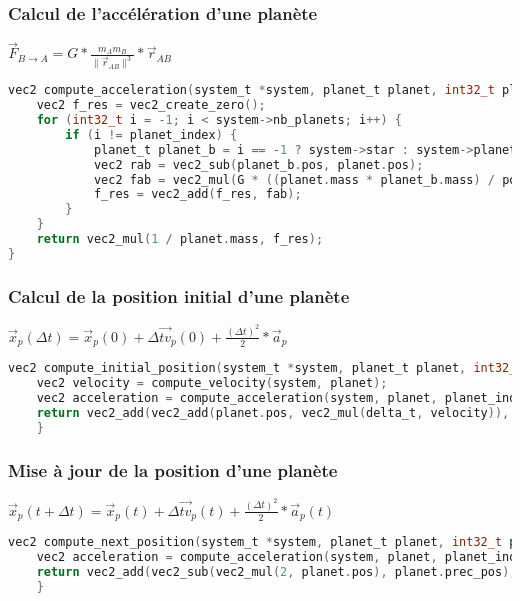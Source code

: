\documentclass[a4paper,10pt]{article}
\begin{document}
    \subsubsection{Calcul de l'accélération d'une planète}

    $\vec{F}_{B\to{}A} = G * \frac{m_{A}m_{B}}{\|\vec{r}_{AB}\|^{3}} * \vec{r}_{AB}$

    \begin{lstlisting}[language=c,label={lst:lstlisting4}]
        vec2 compute_acceleration(system_t *system, planet_t planet, int32_t planet_index) {
    vec2 f_res = vec2_create_zero();
    for (int32_t i = -1; i < system->nb_planets; i++) {
        if (i != planet_index) {
            planet_t planet_b = i == -1 ? system->star : system->planets[i];
            vec2 rab = vec2_sub(planet_b.pos, planet.pos);
            vec2 fab = vec2_mul(G * ((planet.mass * planet_b.mass) / pow(vec2_norm(rab), 3)), rab);
            f_res = vec2_add(f_res, fab);
        }
    }
    return vec2_mul(1 / planet.mass, f_res);
}
    \end{lstlisting}
    
    \subsubsection{Calcul de la position initial d'une planète}

    $\vec{x}_{p}(\Delta{}t) = \vec{x}_{p}(0) + \Delta{}\vec{tv}_{p}(0) + \frac{(\Delta{}t)^{2}}{2} * \vec{a}_{p}$

    \begin{lstlisting}[language=c,label={lst:lstlisting5}]
        vec2 compute_initial_position(system_t *system, planet_t planet, int32_t planet_index, double delta_t) {
    vec2 velocity = compute_velocity(system, planet);
    vec2 acceleration = compute_acceleration(system, planet, planet_index);
    return vec2_add(vec2_add(planet.pos, vec2_mul(delta_t, velocity)), vec2_mul(pow(delta_t, 2) / 2, acceleration));
    }
    \end{lstlisting}
    
    \subsubsection{Mise à jour de la position d'une planète}

    $\vec{x}_{p}(t + \Delta{}t) = \vec{x}_{p}(t) + \Delta{}\vec{tv}_{p}(t) + \frac{(\Delta{}t)^{2}}{2} * \vec{a}_{p}(t)$

    \begin{lstlisting}[language=c,label={lst:lstlisting6}]
        vec2 compute_next_position(system_t *system, planet_t planet, int32_t planet_index, double delta_t) {
    vec2 acceleration = compute_acceleration(system, planet, planet_index);
    return vec2_add(vec2_sub(vec2_mul(2, planet.pos), planet.prec_pos), vec2_mul(pow(delta_t, 2), acceleration));
    }
    \end{lstlisting}
\end{document}

